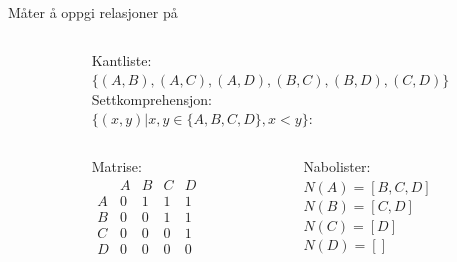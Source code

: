 \begin{frame}[fragile]{Måter å oppgi relasjoner på}
    \begin{columns}
        \begin{column}{0.3\textwidth}
        \end{column}
        \begin{column}{0.65\textwidth}
            \pause
            Kantliste:\\
            $\{(A, B), (A, C), (A, D), (B, C), (B, D), (C, D)\}$\\[5mm]
            \pause
            Settkomprehensjon:\\
            $\{(x, y) | x, y \in \{A,B,C,D\}, x < y\}$:\\[5mm]
            \pause
            \begin{columns}
                \begin{column}{0.27\textwidth}
                    Matrise:\\
                    \begin{math}
                        \begin{matrix}
                              & A & B & C & D\\
                            A & 0 & 1 & 1 & 1\\
                            B & 0 & 0 & 1 & 1\\
                            C & 0 & 0 & 0 & 1\\
                            D & 0 & 0 & 0 & 0
                        \end{matrix}
                    \end{math}
                \end{column}
                \pause
                \begin{column}{0.38\textwidth}
                    Nabolister:\\        
                    $N(A) = [B, C, D]$\\
                    $N(B) = [C, D]$\\
                    $N(C) = [D]$\\
                    $N(D) = []$
                \end{column} 
            \end{columns}
        \end{column}
    \end{columns}
\end{frame}




